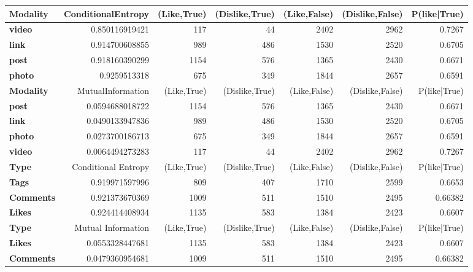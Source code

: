 

\cleardoublepage

\begin{table}
	\centering
	\begin{tabular}{| >{\small}l | >{\small}r | >{\small}r | >{\small}r | >{\small}r | >{\small}r | >{\small}r |}
		\hline
		Modality & ConditionalEntropy & (Like,True) & (Dislike,True) & (Like,False) & (Dislike,False) & P(like|True)\\
		\hline
		\textbf{video} & 0.850116919421 & 117 & 44 & 2402 & 2962 & 0.7267\\
		\hline
		\textbf{link} & 0.914700608855 & 989 & 486 & 1530 & 2520 & 0.6705\\
		\hline
		\textbf{post} & 0.918160390299 & 1154 & 576 & 1365 & 2430 & 0.6671\\
		\hline
		\textbf{photo} & 0.9259513318 & 675 & 349 & 1844 & 2657 & 0.6591\\
		\hline
		\hline
		\textbf{Modality} & MutualInformation & (Like,True) & (Dislike,True) & (Like,False) & (Dislike,False) & P(like|True)\\
		\hline
		\textbf{post} & 0.0594688018722 & 1154 & 576 & 1365 & 2430 & 0.6671\\
		\hline
		\textbf{link} & 0.0490133947836 & 989 & 486 & 1530 & 2520 & 0.6705\\
		\hline
		\textbf{photo} & 0.0273700186713 & 675 & 349 & 1844 & 2657 &  0.6591\\
		\hline
		\textbf{video} & 0.0064494273283 & 117 & 44 & 2402 & 2962 & 0.7267\\
		\hline
		\hline
		\textbf{Type}  & Conditional Entropy & (Like,True) & (Dislike,True) & (Like,False) & (Dislike,False)  & P(like|True)\\
		\hline
		\textbf{Tags}  &  0.919971597996 & 809 & 407 & 1710 & 2599 & 0.6653\\
		\hline
		\textbf{Comments}  &  0.921373670369 & 1009 & 511 & 1510 & 2495 & 0.66382\\
		\hline
		\textbf{Likes}  &  0.924414408934 & 1135 & 583 & 1384 & 2423 & 0.6607\\
		\hline
		\hline
		\textbf{Type}  & Mutual Information & (Like,True) & (Dislike,True) & (Like,False) & (Dislike,False)  & P(like|True)\\
		\hline
		\textbf{Likes}  &  0.0553328447681 & 1135 & 583 & 1384 & 2423 & 0.6607\\
		\hline
		\textbf{Comments}  &  0.0479360954681 & 1009 & 511 & 1510 & 2495 & 0.66382\\

\end{tabular}
\end{table}

